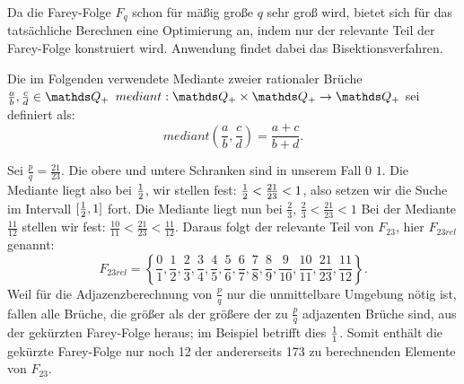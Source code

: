 Da die Farey-Folge $F_q$ schon für mäßig große $q$ sehr groß wird, bietet sich für das tatsächliche Berechnen eine Optimierung an, indem nur der relevante Teil der Farey-Folge konstruiert wird. Anwendung findet dabei das Bisektionsverfahren.
\begin{def1}\label{def:mediant}
	Die im Folgenden verwendete Mediante zweier rationaler Brüche $\frac{a}{b}, \frac{c}{d} \in \Q_+$ $mediant: \Q_+ \times \Q_+ \rightarrow \Q_+$ sei definiert als:
	$$mediant \left(\frac{a}{b}, \frac{c}{d}\right) = \frac{a+c}{b+d}.$$
\end{def1}
\begin{bsp}\label{bsp:Frel}
	Sei $\frac{p}{q} = \frac{21}{23}$. Die obere und untere Schranken sind in unserem Fall $0$ \bzw $1$. Die Mediante liegt also bei $\frac{1}{2}$, wir stellen fest: $\frac{1}{2}<\frac{21}{23}<1$, also setzen wir die Suche im Intervall $[\frac{1}{2}, 1]$ fort. Die Mediante liegt nun bei $\frac{2}{3}$, $\frac{2}{3}<\frac{21}{23}<1$ \usw
	Bei der Mediante $\frac{11}{12}$ stellen wir fest: $\frac{10}{11} < \frac{21}{23} < \frac{11}{12}.$ Daraus folgt der relevante Teil von $F_{23}$, hier $F_{23rel}$ genannt: $$F_{23rel} = \left\{\frac{0}{1}, \frac{1}{2}, \frac{2}{3}, \frac{3}{4}, \frac{4}{5}, \frac{5}{6}, \frac{6}{7}, \frac{7}{8}, \frac{8}{9}, \frac{9}{10}, \frac{10}{11}, \frac{21}{23}, \frac{11}{12}\right\}.$$
	Weil für die Adjazenzberechnung von $\frac{p}{q}$ nur die unmittelbare Umgebung nötig ist, fallen alle Brüche, die größer als der größere der zu $\frac{p}{q}$ adjazenten Brüche sind, aus der gekürzten Farey-Folge heraus; im Beispiel betrifft dies $\frac{1}{1}$.
	Somit enthält die gekürzte Farey-Folge nur noch 12 der andererseits 173 zu berechnenden Elemente von $F_{23}$.
\end{bsp}


